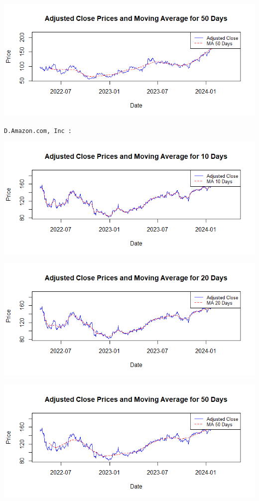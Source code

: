 \documentclass[
  letterpaper,
  DIV=11,
  numbers=noendperiod]{scrartcl}
\begin{document}
\includegraphics{images/MovingAverage50daysMD.png}

\texttt{D.Amazon.com,\ Inc\ :}

\includegraphics{images/MovingAverage10daysAmazon.png}

\includegraphics{images/MovingAverage20daysAmazon.png}

\includegraphics{images/MovingAverage50daysAmazon.png}
\end{document}
